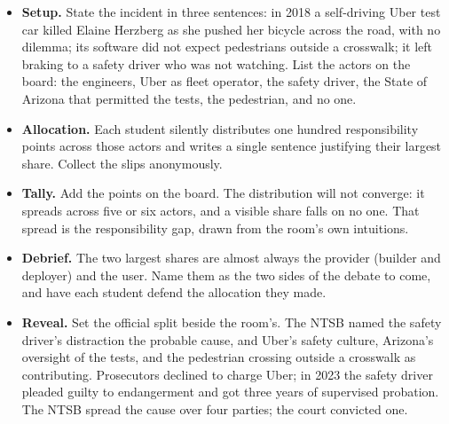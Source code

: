 \begin{itemize}
    \item \textbf{Setup.} State the incident in three sentences: in 2018 a
    self-driving Uber test car killed Elaine Herzberg as she pushed her
    bicycle across the road, with no dilemma; its software did not expect
    pedestrians outside a crosswalk; it left braking to a safety driver who
    was not watching. List the actors on the board: the engineers, Uber as
    fleet operator, the safety driver, the State of Arizona that permitted
    the tests, the pedestrian, and no one.
    \item \textbf{Allocation.} Each student silently distributes one
    hundred responsibility points across those actors and writes a single
    sentence justifying their largest share. Collect the slips anonymously.%
    \item \textbf{Tally.} Add the points on the board. The distribution
    will not converge: it spreads across five or six actors, and a visible
    share falls on no one. That spread is the responsibility gap, drawn from
    the room's own intuitions.
    \item \textbf{Debrief.} The two largest shares are almost always the
    provider (builder and deployer) and the user. Name them as the two
    sides of the debate to come, and have each student defend the allocation
    they made.
    \item \textbf{Reveal.} Set the official split beside the room's. The
    NTSB named the safety driver's distraction the probable cause, and
    Uber's safety culture, Arizona's oversight of the tests, and the
    pedestrian crossing outside a crosswalk as contributing. Prosecutors
    declined to charge Uber; in 2023 the safety driver pleaded guilty to
    endangerment and got three years of supervised probation. The NTSB
    spread the cause over four parties; the court convicted one.
\end{itemize}

